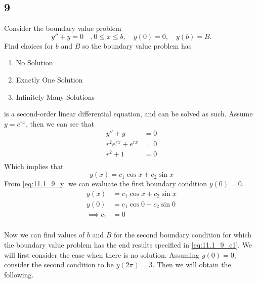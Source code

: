 \documentclass[12pt]{article}
\begin{document}
\subsection{9}
Consider the boundary value problem 
\begin{equation}
  \label{eq:11.1_9}
  y''+y=0\quad, 0\leq x\leq b,\quad y(0)=0,\quad y(b)=B.
\end{equation}
Find choices for $b$ and $B$ so the boundary value problem has
\begin{enumerate}
\item No Solution
\item Exactly One Solution
\item Infinitely Many Solutions
\end{enumerate}

 is a second-order linear differential equation,
and can be solved as such. Assume $y=e^{rx}$, then we can see that
\begin{equation*}
  \begin{aligned}
    y''+y&=0 \\
    r^2e^{rx}+e^{rx}&=0 \\
    r^2+1&=0 \\
  \end{aligned}
\end{equation*}
Which implies that
\begin{equation}
  \label{eq:11.1_9_y}
  y(x)=c_1\cos x + c_2\sin x
\end{equation}
From \cref{eq:11.1_9_y} we can evaluate the first boundary condition
$y(0)=0$.
\begin{equation}
  \label{eq:11.1_9_c1}
  \begin{aligned}
    y(x)&=c_1\cos x + c_2\sin x \\
    y(0)&=c_1\cos 0 + c_2\sin 0 \\
    \implies c_1&=0 \\
  \end{aligned}
\end{equation}

Now we can find values of $b$ and $B$ for the second boundary
condition for which the boundary value problem has the end results
specified in \cref{eq:11.1_9_c1}. We will first consider the case when
there is no solution. Assuming $y(0)=0$, consider the second condition
to be $y(2\pi)=3$. Then we will obtain the following.
\end{document}
